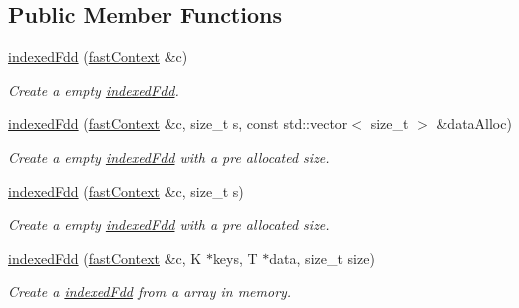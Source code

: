 \subsection*{Public Member Functions}
\begin{DoxyCompactItemize}
\item 
\hypertarget{classfaster_1_1indexedFdd_a00f525684f5c451a2824e3244b256604}{}\label{classfaster_1_1indexedFdd_a00f525684f5c451a2824e3244b256604} 
\hyperlink{classfaster_1_1indexedFdd_a00f525684f5c451a2824e3244b256604}{indexed\+Fdd} (\hyperlink{classfaster_1_1fastContext}{fast\+Context} \&c)
\begin{DoxyCompactList}\small\item\em Create a empty \hyperlink{classfaster_1_1indexedFdd}{indexed\+Fdd}. \end{DoxyCompactList}\item 
\hypertarget{classfaster_1_1indexedFdd_abe773f041ad055a201b986bf5ed2903e}{}\label{classfaster_1_1indexedFdd_abe773f041ad055a201b986bf5ed2903e} 
\hyperlink{classfaster_1_1indexedFdd_abe773f041ad055a201b986bf5ed2903e}{indexed\+Fdd} (\hyperlink{classfaster_1_1fastContext}{fast\+Context} \&c, size\+\_\+t s, const std\+::vector$<$ size\+\_\+t $>$ \&data\+Alloc)
\begin{DoxyCompactList}\small\item\em Create a empty \hyperlink{classfaster_1_1indexedFdd}{indexed\+Fdd} with a pre allocated size. \end{DoxyCompactList}\item 
\hypertarget{classfaster_1_1indexedFdd_a9f6dc447c25e6bf1143348cbc2fff92d}{}\label{classfaster_1_1indexedFdd_a9f6dc447c25e6bf1143348cbc2fff92d} 
\hyperlink{classfaster_1_1indexedFdd_a9f6dc447c25e6bf1143348cbc2fff92d}{indexed\+Fdd} (\hyperlink{classfaster_1_1fastContext}{fast\+Context} \&c, size\+\_\+t s)
\begin{DoxyCompactList}\small\item\em Create a empty \hyperlink{classfaster_1_1indexedFdd}{indexed\+Fdd} with a pre allocated size. \end{DoxyCompactList}\item 
\hypertarget{classfaster_1_1indexedFdd_a2dcdec6b27dadc929564ff3023eba569}{}\label{classfaster_1_1indexedFdd_a2dcdec6b27dadc929564ff3023eba569} 
\hyperlink{classfaster_1_1indexedFdd_a2dcdec6b27dadc929564ff3023eba569}{indexed\+Fdd} (\hyperlink{classfaster_1_1fastContext}{fast\+Context} \&c, K $\ast$keys, T $\ast$data, size\+\_\+t size)
\begin{DoxyCompactList}\small\item\em Create a \hyperlink{classfaster_1_1indexedFdd}{indexed\+Fdd} from a array in memory. \end{DoxyCompactList}\item 

\end{DoxyCompactItemize}
